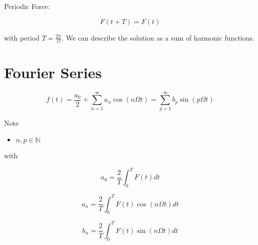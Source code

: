 \documentclass{article}
\newtheorem{one minute paper}[theorem]{One Minute Paper}
\begin{document}
Periodic Force:

\begin{equation}
    F(t + T) = F(t)
\end{equation}

with period $T = \frac{2\pi}{\Omega}$. We can describe the solution as a sum of harmonic functions. 

\section*{Fourier Series}

\begin{equation}
    f(t) = \frac{a_0}{2} + \sum_{n=1}^{\infty}a_n\cos(n\Omega t) = \sum_{p = 1}^{\infty}b_p\sin(p\Omega t)
\end{equation}

Note
\begin{itemize}
    \item $n, p \in \mathbb{N}$
\end{itemize}

with 

\begin{equation}
    a_0 = \frac{2}{T}\int_{0}^{T}F(t)dt
\end{equation}

\begin{equation}
    a_n = \frac{2}{T}\int_{0}^{T}F(t)\cos(n\Omega t)dt
\end{equation}

\begin{equation}
    b_n = \frac{2}{T}\int_{0}^{T}F(t)\sin(n\Omega t)dt
\end{equation}
\end{document}

